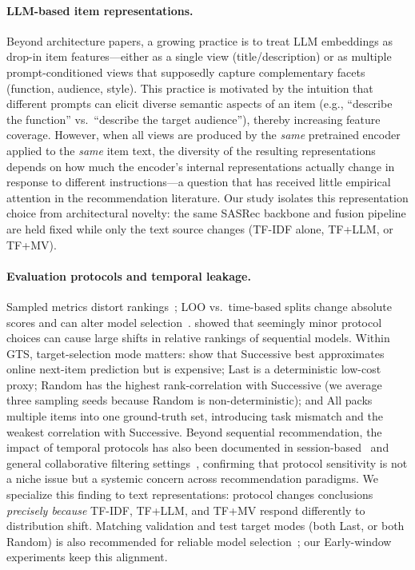 \documentclass[sigconf,natbib=true,anonymous]{acmart}
\newcommand{\tfidf}{\textsc{TF-IDF}\xspace}
\newcommand{\tfllm}{\textsc{TF+LLM}\xspace}
\newcommand{\tfmv}{\textsc{TF+MV}\xspace}
\begin{document}
\paragraph{LLM-based item representations.}
Beyond architecture papers, a growing practice is to treat LLM embeddings as drop-in item features---either as a single view (title/description) or as multiple prompt-conditioned views that supposedly capture complementary facets (function, audience, style).
This practice is motivated by the intuition that different prompts can elicit diverse semantic aspects of an item (e.g., ``describe the function'' vs.\ ``describe the target au\-dience''), thereby increasing feature coverage.
However, when all views are produced by the \emph{same} pretrained encoder applied to the \emph{same} item text, the diversity of the resulting representations depends on how much the encoder's internal representations actually change in response to different instructions---a question that has received little empirical attention in the recommendation literature.
Our study isolates this representation choice from architectural novelty: the same SASRec backbone and fusion pipeline are held fixed while only the text source changes (\tfidf alone, \tfllm, or \tfmv).

\paragraph{Evaluation protocols and temporal leakage.}
Sampled metrics distort rankings~\cite{krichene2020sampledmetrics}; LOO vs.\ time-based splits change absolute scores and can alter model selection~\cite{ji2023evaluation,sun2023reevaluation,meng2020temporal}.
\citet{hidasi2018recurrent} showed that seemingly minor protocol choices can cause large shifts in relative rankings of sequential models.
Within GTS, target-selection mode matters: \citet{gusak2025time} show that Successive best approximates online next-item prediction but is expensive; Last is a deterministic low-cost proxy; Random has the highest rank-correlation with Successive (we average three sampling seeds because Random is non-deterministic); and All packs multiple items into one ground-truth set, introducing task mismatch and the weakest correlation with Successive.
Beyond sequential recommendation, the impact of temporal protocols has also been documented in session-based~\cite{hidasi2018recurrent} and general collaborative filtering settings~\cite{meng2020temporal}, confirming that protocol sensitivity is not a niche issue but a systemic concern across recommendation paradigms.
We specialize this finding to text representations: protocol changes conclusions \emph{precisely because} \tfidf, \tfllm, and \tfmv respond differently to distribution shift.
Matching validation and test target modes (both Last, or both Random) is also recommended for reliable model selection~\cite{gusak2025time}; our Early-window experiments keep this alignment.
\end{document}
